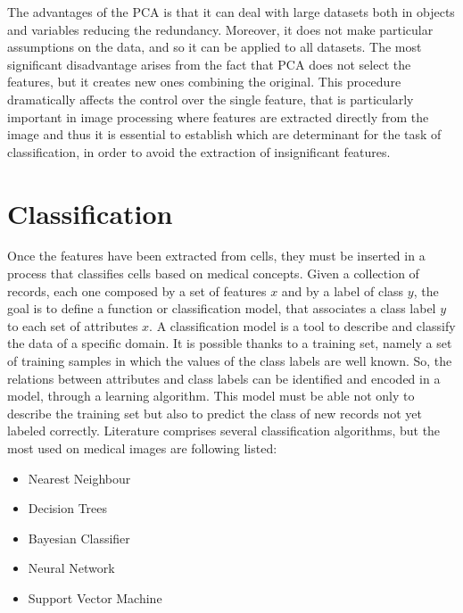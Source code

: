 \documentclass[final,a4paper,12pt,english]{UnicaPhdThesis3}
\begin{document}
The advantages of the PCA is that it can deal with large datasets both in objects and variables reducing the redundancy. Moreover, it does not make particular assumptions on the data, and so it can be applied to all datasets. The most significant disadvantage arises from the fact that PCA does not select the features, but it creates new ones combining the original. This procedure dramatically affects the control over the single feature, that is particularly important in image processing where features are extracted directly from the image and thus it is essential to establish which are determinant for the task of classification, in order to avoid the extraction of insignificant features.  

\chapter{Classification}
Once the features have been extracted from cells, they must be inserted in a process that classifies cells based on medical concepts. Given a collection of records, each one composed by a set of features $x$ and by a label of class $y$, the goal is to define a function or classification model, that associates a class label $y$ to each set of attributes $x$. A classification model is a tool to describe and classify the data of a specific domain. It is possible thanks to a training set, namely a set of training samples in which the values ​​of the class labels are well known. So, the relations between attributes and class labels can be identified and encoded in a model, through a learning algorithm. This model must be able not only to describe the training set but also to predict the class of new records not yet labeled correctly. Literature comprises several classification algorithms, but the most used on medical images are following listed:
\begin{itemize}
	\item Nearest Neighbour
	\item Decision Trees
	\item Bayesian Classifier    
	\item Neural Network
	\item Support Vector Machine
\end{itemize}
\end{document}
